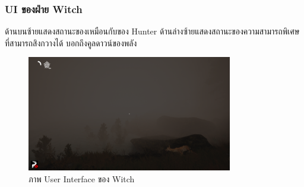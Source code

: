 \subsubsection{UI ของฝ่าย Witch}

ด้านบนซ้ายแสดงสถานะของเหมือนกับของ Hunter ด้านล่างซ้ายแสดงสถานะของความสามารถพิเศษที่สามารถสิงกวางได้ บอกถึงคูลดาวน์ของพลัง

\begin{figure}[h]
  \begin{center}
  \includegraphics[width=0.8\textwidth]{./img/UI/witch_ui.png}
  \end{center}
  \caption[ภาพ User Interface ของ Witch]{ภาพ User Interface ของ Witch}
  \label{ภาพ User Interface ของ Witch}
\end{figure}